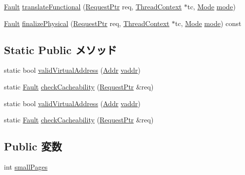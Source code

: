 \begin{DoxyCompactItemize}
\item 
\hyperlink{classRefCountingPtr}{Fault} \hyperlink{classMipsISA_1_1TLB_a26658814c6c9034665aae19cf25545bb}{translateFunctional} (\hyperlink{classRequest}{RequestPtr} req, \hyperlink{classThreadContext}{ThreadContext} $\ast$tc, \hyperlink{classBaseTLB_a46c8a310cf4c094f8c80e1cb8dc1f911}{Mode} \hyperlink{namespaceMipsISA_ae317cde5969f1a58116b73ae0d8adec0}{mode})
\item 
\hyperlink{classRefCountingPtr}{Fault} \hyperlink{classMipsISA_1_1TLB_ae199d95c42e036851a8a0543c6d6d2e3}{finalizePhysical} (\hyperlink{classRequest}{RequestPtr} req, \hyperlink{classThreadContext}{ThreadContext} $\ast$tc, \hyperlink{classBaseTLB_a46c8a310cf4c094f8c80e1cb8dc1f911}{Mode} \hyperlink{namespaceMipsISA_ae317cde5969f1a58116b73ae0d8adec0}{mode}) const 
\end{DoxyCompactItemize}
\subsection*{Static Public メソッド}
\begin{DoxyCompactItemize}
\item 
static bool \hyperlink{classMipsISA_1_1TLB_a3e576c3e0d39dfca708baea44ebf0617}{validVirtualAddress} (\hyperlink{classm5_1_1params_1_1Addr}{Addr} \hyperlink{namespaceMipsISA_ac78d9788b3f9a366df64485c9afaf1b1}{vaddr})
\item 
static \hyperlink{classRefCountingPtr}{Fault} \hyperlink{classMipsISA_1_1TLB_a40ebca6d00905ad6f0ea93be1621a1bd}{checkCacheability} (\hyperlink{classRequest}{RequestPtr} \&req)
\item 
static bool \hyperlink{classMipsISA_1_1TLB_a3e576c3e0d39dfca708baea44ebf0617}{validVirtualAddress} (\hyperlink{classm5_1_1params_1_1Addr}{Addr} \hyperlink{namespaceMipsISA_ac78d9788b3f9a366df64485c9afaf1b1}{vaddr})
\item 
static \hyperlink{classRefCountingPtr}{Fault} \hyperlink{classMipsISA_1_1TLB_a745813e9dbe31434a535773f4fd1396e}{checkCacheability} (\hyperlink{classRequest}{RequestPtr} \&req)
\end{DoxyCompactItemize}
\subsection*{Public 変数}
\begin{DoxyCompactItemize}
\item 
int \hyperlink{classMipsISA_1_1TLB_a005f53c9e1a19cb4bb0b792e490416b9}{smallPages}
\end{DoxyCompactItemize}
